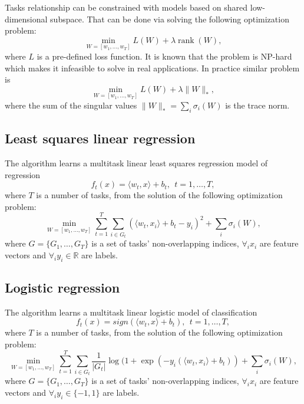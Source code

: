 Tasks relationship can be constrained with models based on shared low-dimensional subspace. That can be done
via solving the following optimization problem:
$$
\min_{W=\left[w_1, \dots, w_T\right]} L (W) + \lambda \mathop{\mathrm{rank}}(W),
$$
where $L$ is a pre-defined loss function. It is known that the problem is NP-hard which makes it infeasible
to solve in real applications. In practice similar problem is
$$
\min_{W=\left[w_1, \dots, w_T\right]} L (W) + \lambda \|W\|_{*},
$$
where the sum of the singular values $\|W\|_{*} = \sum_i \sigma_i(W)$ is the trace norm.

\subsection{Least squares linear regression}

The algorithm learns a multitask linear least squares regression model of regression 
$$
f_t(x) = \langle w_t,x \rangle + b_t, ~~ t = 1, \dots, T,
$$
where $T$ is a number of tasks, from the solution of the following optimization problem:
$$
\min_{W=\left[w_1, \dots, w_T\right]} \sum_{t=1}^{T} \sum_{i \in G_t} \left(\langle w_t,x_i \rangle + b_t - y_i\right)^2
+ \sum_i \sigma_i(W),
$$
where $G = \{ G_1, \dots, G_T \}$ is a set of tasks' non-overlapping indices, $\forall_i x_i$ are feature 
vectors and $\forall_i y_i \in \mathbb{R}$ are labels.

\subsection{Logistic regression}

The algorithm learns a multitask linear logistic model of classification 
$$
f_t(x) = sign (\langle w_t,x \rangle + b_t), ~~ t = 1, \dots, T,
$$
where $T$ is a number of tasks, from the solution of the following optimization problem:
$$
\min_{W=\left[w_1, \dots, w_T\right]} \sum_{t=1}^{T} \sum_{i \in G_t} \frac{1}{|G_t|} \log (1+\exp\left(-y_i(\langle w_t,x_i \rangle + b_t)\right)
+ \sum_i \sigma_i(W),
$$
where $G = \{ G_1, \dots, G_T \}$ is a set of tasks' non-overlapping indices, $\forall_i x_i$ are feature 
vectors and $\forall_i y_i \in \{-1,1\}$ are labels.
